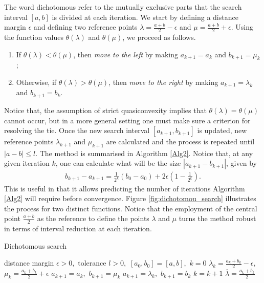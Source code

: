 The word dichotomous refer to the mutually exclusive parts that the search interval $[a,b]$ is divided at each iteration. We start by defining a distance margin $\epsilon$ and defining two reference points $\lambda = \frac{a+b}{2} - \epsilon$ and $\mu = \frac{a+b}{2} + \epsilon$. Using the function values $\theta(\lambda)$ and $\theta(\mu)$, we proceed as follows.
%
\begin{enumerate}
\item If $\theta(\lambda) < \theta(\mu)$, then \emph{move to the left} by making $a_{k+1} = a_{k}$ and $b_{k+1} = \mu_k$;
\item Otherwise, if $\theta(\lambda) > \theta(\mu)$, then \emph{move to the right} by making $a_{k+1} = \lambda_{k}$ and $b_{k+1} = b_k$.
\end{enumerate}
%
Notice that, the assumption of strict quasiconvexity implies that $\theta(\lambda) = \theta(\mu)$ cannot occur, but in a more general setting one must make sure a criterion for resolving the tie. Once the new search interval $[a_{k+1}, b_{k+1}]$ is updated, new reference points $\lambda_{k+1}$ and $\mu_{k+1}$ are calculated and the process is repeated until $|a-b| \leq l$. The method is summarised in Algorithm \ref{Alg2}. Notice that, at any given iteration $k$, one can calculate what will be the size $|a_{k+1}-b_{k+1}|$, given by
%
\begin{align*}
b_{k+1} - a_{k+1} = \frac{1}{2^k}(b_0 - a_0) + 2\epsilon \left(1 - \frac{1}{2^k}\right ).
\end{align*}
%
This is useful in that it allows predicting the number of iterations Algorithm \ref{Alg2} will require before convergence. Figure \ref{fig:dichotomou_search} illustrates the process for two distinct functions. Notice that the employment of the central point $\frac{a+b}{2}$ as the reference to define the points $\lambda$ and $\mu$ turns the method robust in terms of interval reduction at each iteration.
%
\begin{algorithm}[H]
\caption{Dichotomous search} \label{Alg2}
\begin{algorithmic}[1] %
 distance margin $\epsilon > 0,$ tolerance $l > 0,$ $[a_0,b_0] = [a,b],$ $k = 0$ 
\State $\lambda_k = \frac{a_k + b_k}{2} - \epsilon,$ $\mu_k = \frac{a_k + b_k}{2} + \epsilon$
 \State $a_{k+1} = a_k,$ $b_{k+1} = \mu_{k}$
\Else \State $a_{k+1} = \lambda_k,$ $b_{k+1} = b_k$
\EndIf 
\State $k = k+1$
\EndWhile
{} $\overline{\lambda} = \frac{a_k + b_k}{2}$
\end{algorithmic}
\end{algorithm}
